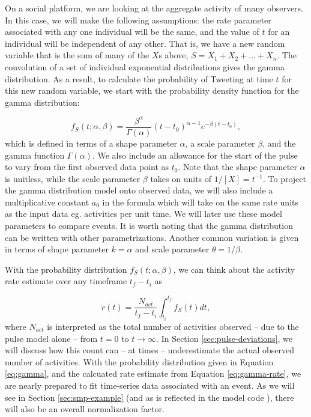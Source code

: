 \documentclass{article}
\begin{document}
On a social platform, we are looking at the aggregate activity of many observers. In this case, we will make the following assumptions: the rate parameter associated with any one individual will be the same, and the value of $t$ for an individual will be independent of any other. That is, we have a new random variable that is the sum of many of the $X$s above, $S = X_1 + X_2 + \ldots + X_n$. The convolution of a set of individual exponential distributions gives the gamma distribution.\cite{Hogg2013} As a result, to calculate the probability of Tweeting at time $t$ for this new random variable, we start with the probability density function for the gamma distribution: 

\begin{equation}
f_S(t;\alpha,\beta) = \frac{ \beta^{\alpha} } {\Gamma(\alpha) } (t-t_0)^{\alpha-1} e^{-\beta(t-t_0)}, 
\label{eq:gamma}
\end{equation}
which is defined in terms of a shape parameter $\alpha$, a scale parameter $\beta$, and the gamma function $\Gamma(\alpha)$.\cite{Hogg2013} We also include an allowance for the start of the pulse to vary from the first observed data point as $t_0$. Note that the shape parameter $\alpha$ is unitless, while the scale parameter $\beta$ takes on units of $1/[X] = t^{-1}$. To project the gamma distribution model onto observed data, we will also include a multiplicative constant $a_0$ in the formula which will take on the same rate units as the input data eg. activities per unit time. We will later use these model parameters to compare events. It is worth noting that the gamma distribution can be written with other parametrizations. Another common variation is given in terms of shape parameter $k = \alpha$ and scale parameter $\theta = 1/\beta$. 

With the probability distribution $f_S(t;\alpha,\beta)$, we can think about the activity rate estimate over any timeframe $t_f - t_i$ as

\begin{equation}
r(t) = \frac{ N_{act} }{ t_f - t_i } \int_{t_i}^{t_f} f_S(t) dt, 
\label{eq:gamma-rate}
\end{equation}
where $N_{act}$ is interpreted as the total number of activities observed -- due to the pulse model alone -- from $t = 0$ to $t \rightarrow \infty$. In Section \ref{sec:pulse-deviations}, we will discuss how this count can -- at times -- underestimate the actual observed number of activities. With the probability distribution given in Equation \ref{eq:gamma}, and the calcuated rate estimate from Equation \ref{eq:gamma-rate}, we are nearly prepared to fit time-series data associated with an event. As we will see in Section \ref{sec:smp-example} (and as is reflected in the model code \cite{pulse}), there will also be an overall normalization factor.  
\end{document}
